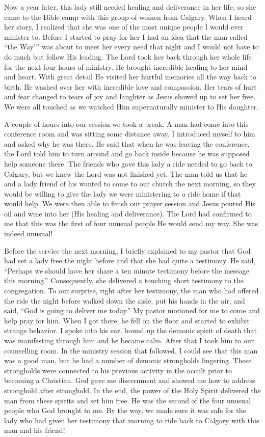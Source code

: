 \documentclass[oneside]{book}
\begin{document}
Now a year later, this lady still needed healing and deliverance in her life, so she came to the Bible camp with this group of women from Calgary. When I heard her story, I realized that she was one of the most unique people I would ever minister to. Before I started to pray for her I had an idea that the man called “the Way”' was about to meet her every need that night and I would not have to do much but follow His leading. The Lord took her back through her whole life for the next four hours of ministry. He brought incredible healing to her mind and heart. With great detail He visited her hurtful memories all the way back to birth. He washed over her with incredible love and compassion. Her tears of hurt and fear changed to tears of joy and laughter as Jesus showed up to set her free. We were all touched as we watched Him supernaturally minister to His daughter.


A couple of hours into our session we took a break. A man had come into this conference room and was sitting some distance away. I introduced myself to him and asked why he was there. He said that when he was leaving the conference, the Lord told him to turn around and go back inside because he was supposed help someone there. The friends who gave this lady a ride needed to go back to Calgary, but we knew the Lord was not finished yet. The man told us that he and a lady friend of his wanted to come to our church the next morning, so they would be willing to give the lady we were ministering to a ride home if that would help. We were then able to finish our prayer session and Jesus poured His oil and wine into her (His healing and deliverance). The Lord had confirmed to me that this was the first of four unusual people He would send my way. She was indeed unusual!


Before the service the next morning, I briefly explained to my pastor that God had set a lady free the night before and that she had quite a testimony. He said, “Perhaps we should have her share a ten minute testimony before the message this morning.” Consequently, she delivered a touching short testimony to the congregation. To our surprise, right after her testimony, the man who had offered the ride the night before walked down the aisle, put his hands in the air, and said, “God is going to deliver me today.” My pastor motioned for me to come and help pray for him. When I got there, he fell on the floor and started to exhibit strange behavior. I spoke into his ear, bound up the demonic spirit of death that was manifesting through him and he became calm. After that I took him to our counselling room. In the ministry session that followed, I could see that this man was a good man, but he had a number of demonic strongholds lingering. These strongholds were connected to his previous activity in the occult prior to becoming a Christian. God gave me discernment and showed me how to address stronghold after stronghold. In the end, the power of the Holy Spirit delivered the man from these spirits and set him free. He was the second of the four unusual people who God brought to me. By the way, we made sure it was safe for the lady who had given her testimony that morning to ride back to Calgary with this man and his friend! 
\end{document}
